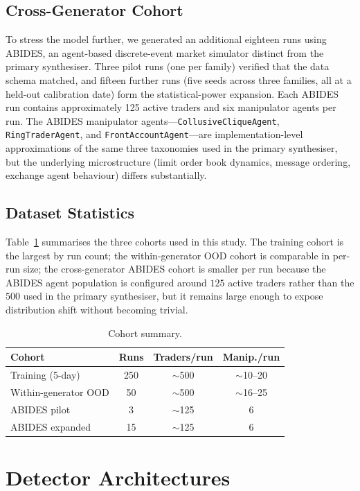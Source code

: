 \documentclass[10pt,twocolumn,letterpaper]{article}
\begin{document}
\subsection{Cross-Generator Cohort}
To stress the model further, we generated an additional eighteen runs
using ABIDES, an agent-based discrete-event market simulator
distinct from the primary synthesiser. Three pilot runs (one per
family) verified that the data schema matched, and fifteen further
runs (five seeds across three families, all at a held-out calibration
date) form the statistical-power expansion. Each ABIDES run contains
approximately 125 active traders and six manipulator agents per run.
The ABIDES manipulator agents---\texttt{CollusiveCliqueAgent},
\texttt{RingTraderAgent}, and \texttt{FrontAccountAgent}---are
implementation-level approximations of the same three taxonomies used
in the primary synthesiser, but the underlying microstructure (limit
order book dynamics, message ordering, exchange agent behaviour)
differs substantially.


\subsection{Dataset Statistics}
\label{sec:stats}
Table~\ref{tab:cohorts} summarises the three cohorts used in this
study. The training cohort is the largest by run count; the
within-generator OOD cohort is comparable in per-run size; the
cross-generator ABIDES cohort is smaller per run because the ABIDES
agent population is configured around \(125\) active traders rather
than the \(500\) used in the primary synthesiser, but it remains
large enough to expose distribution shift without becoming trivial.

\begin{table}[t]
\caption{Cohort summary.}
\label{tab:cohorts}
\centering
\footnotesize
\begin{tabular}{lccc}
\toprule
Cohort & Runs & Traders/run & Manip./run \\
\midrule
Training (5-day) & 250 & $\sim$500 & $\sim$10--20 \\
Within-generator OOD & 50 & $\sim$500 & $\sim$16--25 \\
ABIDES pilot & 3 & $\sim$125 & 6 \\
ABIDES expanded & 15 & $\sim$125 & 6 \\
\bottomrule
\end{tabular}
\end{table}

\section{Detector Architectures}
\label{sec:methods}
\end{document}
